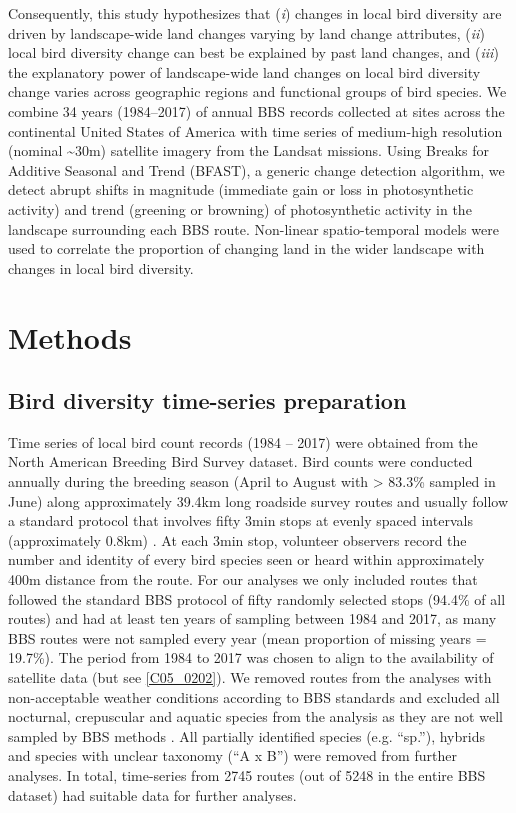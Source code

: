 Consequently, this study hypothesizes that (\textit{i}) changes in local bird diversity are driven by landscape-wide land changes varying by land change attributes, (\textit{ii}) local bird diversity change can best be explained by past land changes, and (\textit{iii}) the explanatory power of landscape-wide land changes on local bird diversity change varies across geographic regions and functional groups of bird species. We combine 34 years (1984–2017) of annual BBS records collected at sites across the continental United States of America with time series of medium-high resolution (nominal \textasciitilde30m) satellite imagery from the Landsat missions. Using Breaks for Additive Seasonal and Trend (BFAST), a generic change detection algorithm, we detect abrupt shifts in magnitude (immediate gain or loss in photosynthetic activity) and trend (greening or browning) of photosynthetic activity in the landscape surrounding each BBS route. Non-linear spatio-temporal models were used to correlate the proportion of changing land in the wider landscape with changes in local bird diversity.

\section{Methods}
\label{C05_02}
\subsection{Bird diversity time-series preparation}
\label{C05_0201}

Time series of local bird count records (1984 – 2017) were obtained from the North American Breeding Bird Survey \citep[BBS, available from \href{https://www.pwrc.usgs.gov/bbs/}{https://www.pwrc.usgs.gov/bbs/},][]{Pardieck2018} dataset. Bird counts were conducted annually during the breeding season (April to August with > 83.3\% sampled in June) along approximately 39.4km long roadside survey routes and usually follow a standard protocol that involves fifty 3min stops at evenly spaced intervals (approximately 0.8km) \citep{Ralph1995}. At each 3min stop, volunteer observers record the number and identity of every bird species seen or heard within approximately 400m distance from the route. For our analyses we only included routes that followed the standard BBS protocol of fifty randomly selected stops (94.4\% of all routes) and had at least ten years of sampling between 1984 and 2017, as many BBS routes were not sampled every year (mean proportion of missing years = 19.7\%). The period from 1984 to 2017 was chosen to align to the availability of satellite data (but see \ref{C05_0202}). We removed routes from the analyses with non-acceptable weather conditions according to BBS standards \citep{Ralph1995} and excluded all nocturnal, crepuscular and aquatic species from the analysis as they are not well sampled by BBS methods \citep{Gutzwiller2015,Jarzyna2017}. All partially identified species (e.g. “sp.”), hybrids and species with unclear taxonomy (\eg  “A x B”) were removed from further analyses. In total, time-series from 2745 routes (out of 5248 in the entire BBS dataset) had suitable data for further analyses.

